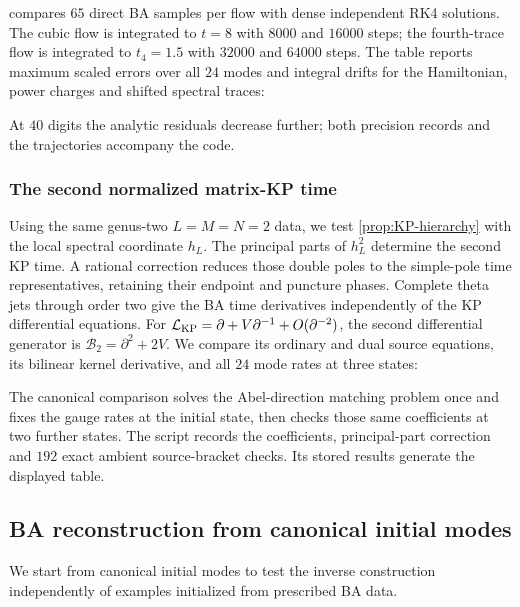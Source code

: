  compares $65$ direct BA samples
per flow with dense independent RK4 solutions. The cubic flow is
integrated to $t=8$ with $8000$ and $16000$ steps; the fourth-trace
flow is integrated to $t_4=1.5$ with $32000$ and $64000$ steps.
The table reports maximum scaled errors over all $24$ modes and
integral drifts for the Hamiltonian, power charges and shifted
spectral traces:

At $40$ digits the analytic residuals decrease further; both precision
records and the trajectories accompany the code.

\subsubsection{The second normalized matrix-KP time}
\label{sec:numeric-KP-time}

Using the same genus-two $L=M=N=2$ data, we test
\cref{prop:KP-hierarchy} with the local spectral coordinate $h_L$.
The principal parts of $h_L^2$ determine the second KP time. A rational
correction reduces those double poles to the simple-pole time
representatives, retaining their endpoint and puncture phases.
Complete theta jets through order two give the BA time derivatives
independently of the KP differential equations.
For $\mathcal L_{\rm KP}=\partial+V\partial^{-1}+O(\partial^{-2})$,
the second differential generator is $\mathcal B_2=\partial^2+2V$.
We compare its ordinary and dual source equations, its bilinear
kernel derivative, and all $24$ mode rates at three states:

The canonical comparison solves the Abel-direction matching problem
once and fixes the gauge rates at the initial state, then checks
those same coefficients at two further states. The script
 records the coefficients,
principal-part correction and $192$ exact ambient source-bracket
checks. Its stored results generate the displayed table.

\subsection{BA reconstruction from canonical initial modes}
\label{sec:numeric-BA-converse}

We start from canonical initial modes to test the inverse construction
independently of examples initialized from prescribed BA data.

